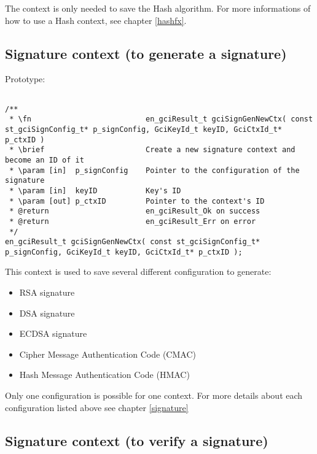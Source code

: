 The context is only needed to save the Hash algorithm.
For more informations of how to use a Hash context, see chapter \ref{hashfx}.

\newpage


\subsection{Signature context (to generate a signature) }

Prototype:
\begin{lstlisting}

/**
 * \fn							en_gciResult_t gciSignGenNewCtx( const st_gciSignConfig_t* p_signConfig, GciKeyId_t keyID, GciCtxId_t* p_ctxID )
 * \brief						Create a new signature context and become an ID of it
 * \param [in]  p_signConfig	Pointer to the configuration of the signature
 * \param [in]  keyID			Key's ID
 * \param [out] p_ctxID			Pointer to the context's ID
 * @return						en_gciResult_Ok on success
 * @return						en_gciResult_Err on error
 */
en_gciResult_t gciSignGenNewCtx( const st_gciSignConfig_t* p_signConfig, GciKeyId_t keyID, GciCtxId_t* p_ctxID );

\end{lstlisting}

This context is used to save several different configuration to generate:
\begin{itemize}
  \item RSA signature
  \item DSA signature
  \item ECDSA signature
  \item Cipher Message Authentication Code (CMAC)
  \item Hash Message Authentication Code (HMAC)
\end{itemize}

Only one configuration is possible for one context. 
\newline
For more details about each configuration listed above see chapter
\ref{signature}

\newpage


\subsection{Signature context (to verify a signature)}

